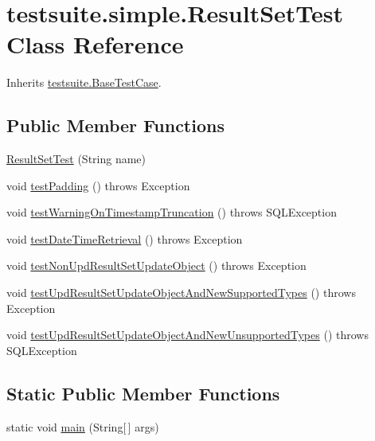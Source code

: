 \hypertarget{classtestsuite_1_1simple_1_1_result_set_test}{}\section{testsuite.\+simple.\+Result\+Set\+Test Class Reference}
\label{classtestsuite_1_1simple_1_1_result_set_test}


Inherits \mbox{\hyperlink{classtestsuite_1_1_base_test_case}{testsuite.\+Base\+Test\+Case}}.

\subsection*{Public Member Functions}
\begin{DoxyCompactItemize}
\item 
\mbox{\hyperlink{classtestsuite_1_1simple_1_1_result_set_test_a88a576d293713b9a39cd1a25dba38cbe}{Result\+Set\+Test}} (String name)
\item 
void \mbox{\hyperlink{classtestsuite_1_1simple_1_1_result_set_test_acf1c1c4e051b0f5eb985231600a7de9a}{test\+Padding}} ()  throws Exception 
\item 
void \mbox{\hyperlink{classtestsuite_1_1simple_1_1_result_set_test_a3331de6ce65d06bf37a254212a523c04}{test\+Warning\+On\+Timestamp\+Truncation}} ()  throws S\+Q\+L\+Exception 
\item 
void \mbox{\hyperlink{classtestsuite_1_1simple_1_1_result_set_test_aba088a225308a47faf9f0e114d00b027}{test\+Date\+Time\+Retrieval}} ()  throws Exception 
\item 
void \mbox{\hyperlink{classtestsuite_1_1simple_1_1_result_set_test_a2e5dc65318a18c87b40ae21b41e9d45d}{test\+Non\+Upd\+Result\+Set\+Update\+Object}} ()  throws Exception 
\item 
void \mbox{\hyperlink{classtestsuite_1_1simple_1_1_result_set_test_aef6c6e08cd7de63e466950bf0319caa7}{test\+Upd\+Result\+Set\+Update\+Object\+And\+New\+Supported\+Types}} ()  throws Exception 
\item 
void \mbox{\hyperlink{classtestsuite_1_1simple_1_1_result_set_test_a4e3fe7ab9df657bbffdfb5110ad408e6}{test\+Upd\+Result\+Set\+Update\+Object\+And\+New\+Unsupported\+Types}} ()  throws S\+Q\+L\+Exception 
\end{DoxyCompactItemize}
\subsection*{Static Public Member Functions}
\begin{DoxyCompactItemize}
\item 
static void \mbox{\hyperlink{classtestsuite_1_1simple_1_1_result_set_test_aced933e77682f32e37de1f8cbf06decd}{main}} (String\mbox{[}$\,$\mbox{]} args)
\end{DoxyCompactItemize}
